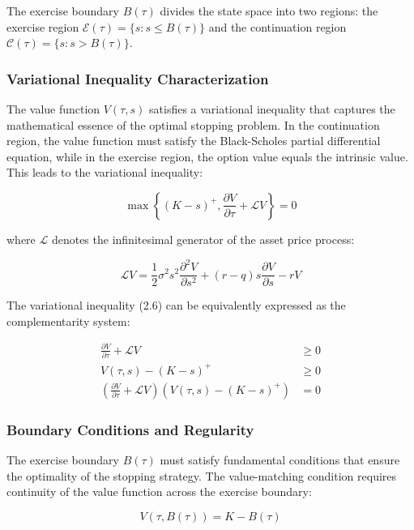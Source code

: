 \documentclass[
  11pt,
  11pt,
  letterpaper,
  onecolumn]{article}
\begin{document}
The exercise boundary \(B(\tau)\) divides the state space into two
regions: the exercise region
\(\mathcal{E}(\tau) = \{s : s \leq B(\tau)\}\) and the continuation
region \(\mathcal{C}(\tau) = \{s : s > B(\tau)\}\).

\subsubsection{Variational Inequality
Characterization}\label{variational-inequality-characterization}

The value function \(V(\tau,s)\) satisfies a variational inequality that
captures the mathematical essence of the optimal stopping problem. In
the continuation region, the value function must satisfy the
Black-Scholes partial differential equation, while in the exercise
region, the option value equals the intrinsic value. This leads to the
variational inequality:

\[\max\left\{(K-s)^+, \frac{\partial V}{\partial \tau} + \mathcal{L}V\right\} = 0 \tag{2.6}\]

where \(\mathcal{L}\) denotes the infinitesimal generator of the asset
price process:

\[\mathcal{L}V = \frac{1}{2}\sigma^2 s^2 \frac{\partial^2 V}{\partial s^2} + (r-q)s\frac{\partial V}{\partial s} - rV \tag{2.7}\]

The variational inequality (2.6) can be equivalently expressed as the
complementarity system:

\[\begin{aligned}
\frac{\partial V}{\partial \tau} + \mathcal{L}V &\geq 0 \\
V(\tau,s) - (K-s)^+ &\geq 0 \\
\left(\frac{\partial V}{\partial \tau} + \mathcal{L}V\right)(V(\tau,s) - (K-s)^+) &= 0
\end{aligned} \tag{2.8}\]

\subsubsection{Boundary Conditions and
Regularity}\label{boundary-conditions-and-regularity}

The exercise boundary \(B(\tau)\) must satisfy fundamental conditions
that ensure the optimality of the stopping strategy. The value-matching
condition requires continuity of the value function across the exercise
boundary:

\[V(\tau, B(\tau)) = K - B(\tau) \tag{2.9}\]
\end{document}
